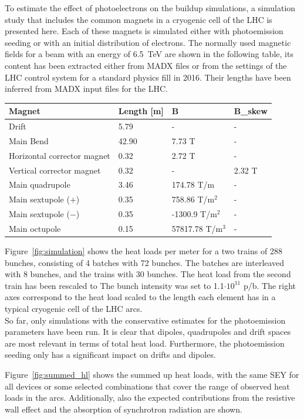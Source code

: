 
To estimate the effect of photoelectrons on the buildup simulations, a simulation study that includes the common magnets in a cryogenic cell of the LHC is presented here.
Each of these magnets is simulated either with photoemission seeding or with an initial distribution of electrons.
The normally used magnetic fields for a beam with an energy of 6.5~TeV are shown in the following table, its content has been extracted either from MADX files or from the settings of the LHC control system for a standard physics fill in 2016.
Their lengths have been inferred from MADX input files for the LHC.
\begin{center}
    \begin{tabular}{llll}
        \textbf{Magnet} & \textbf{Length} [m]&\textbf{B} & \textbf{B\_skew}\\ \hline
        Drift & 5.79 & - & - \\
        Main Bend & 42.90 & 7.73 T& - \\
        Horizontal corrector magnet & 0.32 & 2.72 T & - \\
        Vertical corrector magnet & 0.32 & - & 2.32 T \\
        Main quadrupole & 3.46 & 174.78 T/m& - \\
        Main sextupole ($+$)& 0.35 & 758.86 T/m$^2$ & - \\
        Main sextupole ($-$) & 0.35 & -1300.9 T/m$^2$ & - \\
        Main octupole & 0.15 & 57817.78 T/m$^3$ & - \\
    \end{tabular}
\end{center}

Figure~\ref{fig:simulation} shows the heat loads per meter for a two trains of 288 bunches, consisting of 4 batches with 72 bunches.
The batches are interleaved with 8 bunches, and the trains with 30 bunches.
The heat load from the second train has been rescaled to 
The bunch intensity was set to 1.1$\cdot10^{11}$ p/b.
The right axes correspond to the heat load scaled to the length each element has in a typical cryogenic cell of the LHC arcs.
\\
So far, only simulations with the conservative estimates for the photoemission parameters have been run.
It is clear that dipoles, quadrupoles and drift spaces are most relevant in terms of total heat load.
Furthermore, the photoemission seeding only has a significant impact on drifts and dipoles.

Figure~\ref{fig:summed_hl} shows the summed up heat loads, with the same SEY for all devices or some selected combinations that cover the range of observed heat loads in the arcs.
Additionally, also the expected contributions from the resistive wall effect and the absorption of synchrotron radiation are shown.


